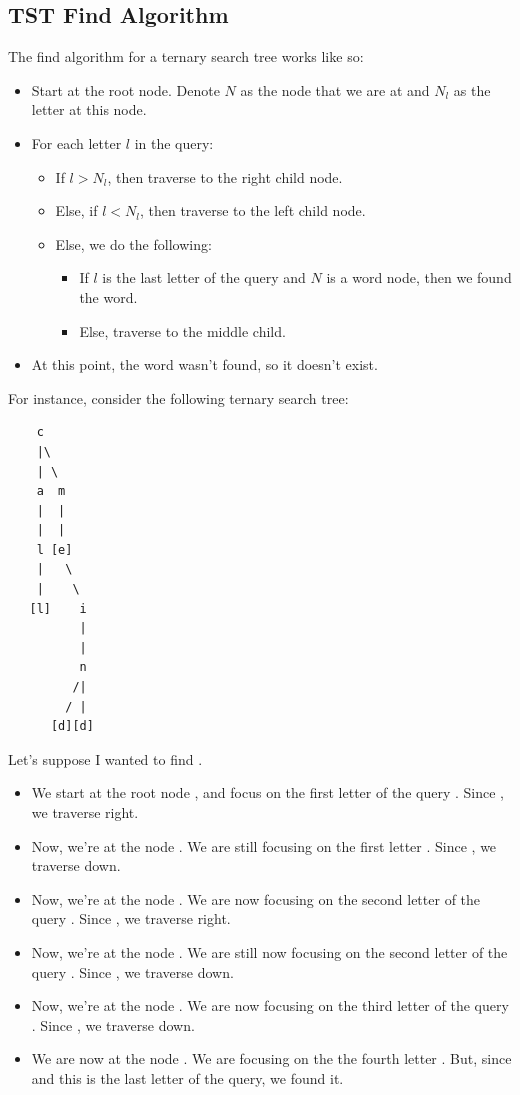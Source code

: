 \documentclass[letterpaper]{article}
\begin{document}
\subsection{TST Find Algorithm}
The find algorithm for a ternary search tree works like so: 
\begin{itemize}
    \item Start at the root node. Denote $N$ as the node that we are at and $N_l$ as the letter at this node. 
    \item For each letter $l$ in the query: 
    \begin{itemize}
        \item If $l > N_l$, then traverse to the right child node. 
        \item Else, if $l < N_l$, then traverse to the left child node. 
        \item Else, we do the following: 
        \begin{itemize}
            \item If $l$ is the last letter of the query and $N$ is a word node, then we found the word. 
            \item Else, traverse to the middle child. 
        \end{itemize}
    \end{itemize}
    \item At this point, the word wasn't found, so it doesn't exist. 
\end{itemize}

For instance, consider the following ternary search tree: 
\begin{verbatim}
    c
    |\ 
    | \ 
    a  m 
    |  |
    |  |
    l [e]
    |   \ 
    |    \ 
   [l]    i 
          |
          |
          n
         /|
        / |
      [d][d]
\end{verbatim}
Let's suppose I wanted to find .
\begin{itemize}
    \item We start at the root node , and focus on the first letter of the query . Since , we traverse right. 
    \item Now, we're at the node . We are still focusing on the first letter . Since , we traverse down. 
    \item Now, we're at the node \code{e}. We are now focusing on the second letter of the query . Since , we traverse right.
    \item Now, we're at the node . We are still now focusing on the second letter of the query . Since , we traverse down. 
    \item Now, we're at the node \code{n}. We are now focusing on the third letter of the query \code{n}. Since \code{n == n}, we traverse down. 
    \item We are now at the node \code{d}. We are focusing on the the fourth letter \code{d}. But, since \code{d == d} and this is the last letter of the query, we found it.  
\end{itemize}
\end{document}
